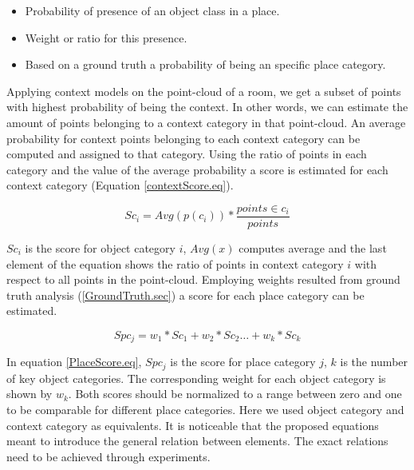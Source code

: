 \begin{itemize}
 \item Probability of presence of an object class in a place.
 \item Weight or ratio for this presence.
 \item Based on a ground truth a probability of being an specific place category.
\end{itemize}

Applying context models on the point-cloud of a room, we get a subset of points with highest probability of being 
the context. 
In other words, we can estimate the amount of points belonging to a context category in that point-cloud.
An average probability for context points belonging to each context category can be computed and assigned to that category.
Using the ratio of points in each category and the value of the average probability a score is estimated for each context
category (Equation \ref{contextScore.eq}).

\begin{equation}
 \label{contextScore.eq}
Sc_i = Avg(p(c_i)) * \frac{points \in c_i}{points} 
\end{equation}

$Sc_i$ is the score for object category $i$, $Avg(x)$ computes average and the last element of the equation shows the ratio
of points in context category $i$ with respect to all points in the point-cloud. 
Employing weights resulted from ground truth analysis (\ref{GroundTruth.sec}) a score for each place category can be 
estimated.

\begin{equation}
 \label{PlaceScore.eq}
 Spc_j = w_1 * Sc_1 + w_2 * Sc_2 \ldots + w_k * Sc_k
\end{equation}

In equation \ref{PlaceScore.eq}, $Spc_j$ is the score for place category $j$, $k$ is the number of key object categories.
The corresponding weight for each object category is shown by $w_k$. 
Both scores should be normalized to a range between zero and one to be comparable for different place categories. 
Here we used object category and context category as equivalents.
It is noticeable that the proposed equations meant to introduce the general relation between elements.
The exact relations need to be achieved through experiments. 





